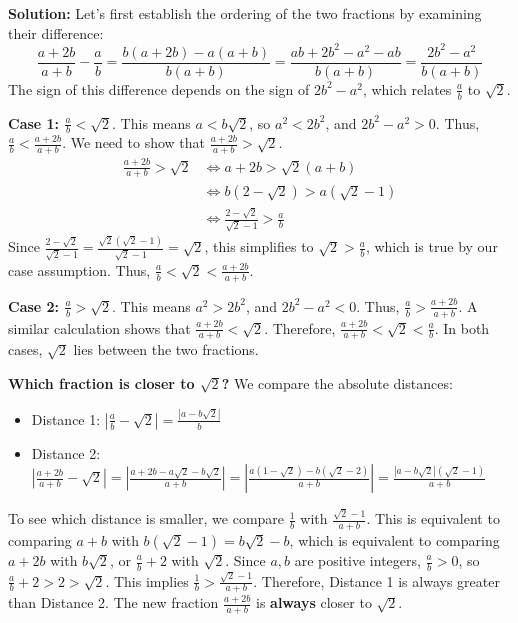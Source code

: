 \textbf{Solution:}
Let's first establish the ordering of the two fractions by examining their difference:
\[
\frac{a + 2b}{a + b} - \frac{a}{b} = \frac{b(a + 2b) - a(a + b)}{b(a + b)} = \frac{ab + 2b^2 - a^2 - ab}{b(a + b)} = \frac{2b^2 - a^2}{b(a + b)}
\]
The sign of this difference depends on the sign of $2b^2 - a^2$, which relates $\frac{a}{b}$ to $\sqrt{2}$.

\textbf{Case 1: $\frac{a}{b} < \sqrt{2}$}. This means $a < b\sqrt{2}$, so $a^2 < 2b^2$, and $2b^2 - a^2 > 0$.
Thus, $\frac{a}{b} < \frac{a+2b}{a+b}$. We need to show that $\frac{a+2b}{a+b} > \sqrt{2}$.
\begin{align*}
\frac{a + 2b}{a + b} > \sqrt{2} &\iff a + 2b > \sqrt{2}(a + b)\\
&\iff b(2 - \sqrt{2}) > a(\sqrt{2} - 1)\\
&\iff \frac{2 - \sqrt{2}}{\sqrt{2} - 1} > \frac{a}{b}
\end{align*}
Since $\frac{2 - \sqrt{2}}{\sqrt{2} - 1} = \frac{\sqrt{2}(\sqrt{2} - 1)}{\sqrt{2} - 1} = \sqrt{2}$, this simplifies to $\sqrt{2} > \frac{a}{b}$, which is true by our case assumption. Thus, $\frac{a}{b} < \sqrt{2} < \frac{a + 2b}{a + b}$.

\textbf{Case 2: $\frac{a}{b} > \sqrt{2}$}. This means $a^2 > 2b^2$, and $2b^2 - a^2 < 0$.
Thus, $\frac{a}{b} > \frac{a+2b}{a+b}$. A similar calculation shows that $\frac{a+2b}{a+b} < \sqrt{2}$.
Therefore, $\frac{a+2b}{a+b} < \sqrt{2} < \frac{a}{b}$. In both cases, $\sqrt{2}$ lies between the two fractions.

\textbf{Which fraction is closer to $\sqrt{2}$?}
We compare the absolute distances:
\begin{itemize}
\item Distance 1: $\left|\frac{a}{b} - \sqrt{2}\right| = \frac{|a - b\sqrt{2}|}{b}$
\item Distance 2: $\left|\frac{a + 2b}{a + b} - \sqrt{2}\right| = \left|\frac{a + 2b - a\sqrt{2} - b\sqrt{2}}{a + b}\right| = \left|\frac{a(1-\sqrt{2}) - b(\sqrt{2}-2)}{a + b}\right| = \frac{|a - b\sqrt{2}|(\sqrt{2}-1)}{a+b}$
\end{itemize}
To see which distance is smaller, we compare $\frac{1}{b}$ with $\frac{\sqrt{2}-1}{a+b}$.
This is equivalent to comparing $a+b$ with $b(\sqrt{2}-1) = b\sqrt{2} - b$, which is equivalent to comparing $a+2b$ with $b\sqrt{2}$, or $\frac{a}{b} + 2$ with $\sqrt{2}$.
Since $a, b$ are positive integers, $\frac{a}{b} > 0$, so $\frac{a}{b} + 2 > 2 > \sqrt{2}$.
This implies $\frac{1}{b} > \frac{\sqrt{2}-1}{a+b}$.
Therefore, Distance 1 is always greater than Distance 2. The new fraction $\frac{a+2b}{a+b}$ is \textbf{always} closer to $\sqrt{2}$.

